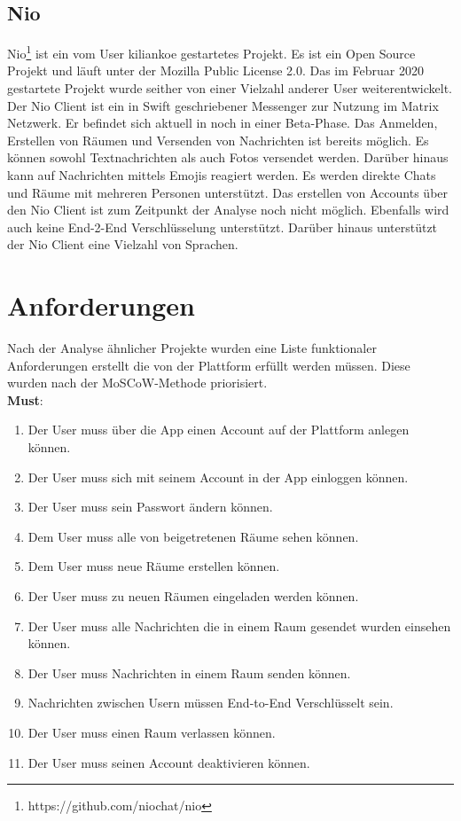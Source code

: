    \subsection{Nio}
    Nio\footnote{https://github.com/niochat/nio} ist ein vom User kiliankoe gestartetes Projekt.
    Es ist ein Open Source Projekt und läuft unter der Mozilla Public License 2.0.
    Das im Februar 2020 gestartete Projekt wurde seither von einer Vielzahl anderer User weiterentwickelt.
    Der Nio Client ist ein in Swift geschriebener Messenger zur Nutzung im Matrix Netzwerk.
    Er befindet sich aktuell in noch in einer Beta-Phase.
    Das Anmelden, Erstellen von Räumen und Versenden von Nachrichten ist bereits möglich.
    Es können sowohl Textnachrichten als auch Fotos versendet werden.
    Darüber hinaus kann auf Nachrichten mittels Emojis reagiert werden.
    Es werden direkte Chats und Räume mit mehreren Personen unterstützt.
    Das erstellen von Accounts über den Nio Client ist zum Zeitpunkt der Analyse noch nicht möglich.
    Ebenfalls wird auch keine End-2-End Verschlüsselung unterstützt.
    Darüber hinaus unterstützt der Nio Client eine Vielzahl von Sprachen.

    \newpage
    \section{Anforderungen}\label{sec:anforderungen}
    Nach der Analyse ähnlicher Projekte wurden eine Liste funktionaler Anforderungen erstellt die von der Plattform erfüllt werden müssen.
    Diese wurden nach der MoSCoW-Methode priorisiert.\\

    \textbf{Must}:
    \begin{enumerate}[label={\roman*.}, leftmargin=2.5cm]
        \item Der User muss über die App einen Account auf der Plattform anlegen können.
        \item Der User muss sich mit seinem Account in der App einloggen können.
        \item Der User muss sein Passwort ändern können.
        \item Dem User muss alle von beigetretenen Räume sehen können.
        \item Dem User muss neue Räume erstellen können.
        \item Der User muss zu neuen Räumen eingeladen werden können.
        \item Der User muss alle Nachrichten die in einem Raum gesendet wurden einsehen können.
        \item Der User muss Nachrichten in einem Raum senden können.
        \item Nachrichten zwischen Usern müssen End-to-End Verschlüsselt sein.
        \item Der User muss einen Raum verlassen können.
        \item Der User muss seinen Account deaktivieren können.
    \end{enumerate}


